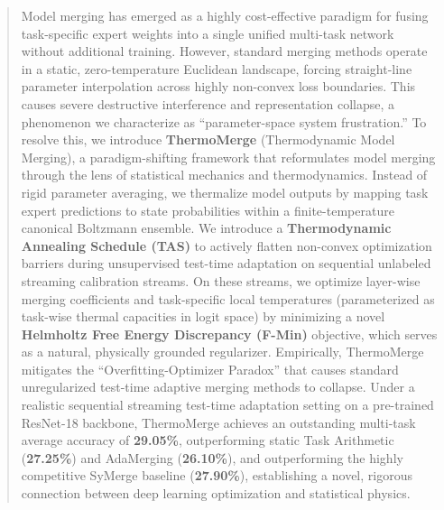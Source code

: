 \begin{abstract}
Model merging has emerged as a highly cost-effective paradigm for fusing task-specific expert weights into a single unified multi-task network without additional training.
However, standard merging methods operate in a static, zero-temperature Euclidean landscape, forcing straight-line parameter interpolation across highly non-convex loss boundaries.
This causes severe destructive interference and representation collapse, a phenomenon we characterize as ``parameter-space system frustration.''
To resolve this, we introduce \textbf{ThermoMerge} (Thermodynamic Model Merging), a paradigm-shifting framework that reformulates model merging through the lens of statistical mechanics and thermodynamics.
Instead of rigid parameter averaging, we thermalize model outputs by mapping task expert predictions to state probabilities within a finite-temperature canonical Boltzmann ensemble.
We introduce a \textbf{Thermodynamic Annealing Schedule (TAS)} to actively flatten non-convex optimization barriers during unsupervised test-time adaptation on sequential unlabeled streaming calibration streams.
On these streams, we optimize layer-wise merging coefficients and task-specific local temperatures (parameterized as task-wise thermal capacities in logit space) by minimizing a novel \textbf{Helmholtz Free Energy Discrepancy (F-Min)} objective, which serves as a natural, physically grounded regularizer.
Empirically, ThermoMerge mitigates the ``Overfitting-Optimizer Paradox'' that causes standard unregularized test-time adaptive merging methods to collapse.
Under a realistic sequential streaming test-time adaptation setting on a pre-trained ResNet-18 backbone, ThermoMerge achieves an outstanding multi-task average accuracy of \textbf{29.05\%}, outperforming static Task Arithmetic (\textbf{27.25\%}) and AdaMerging (\textbf{26.10\%}), and outperforming the highly competitive SyMerge baseline (\textbf{27.90\%}), establishing a novel, rigorous connection between deep learning optimization and statistical physics.
\end{abstract}
